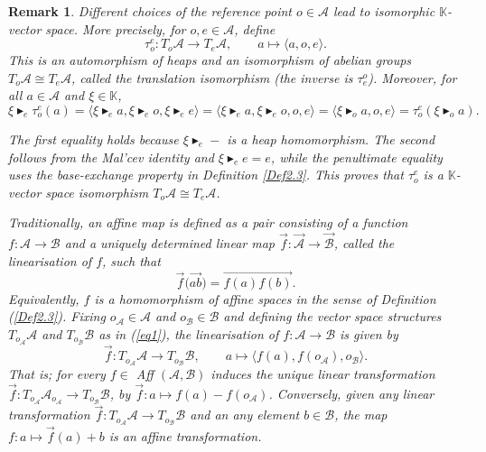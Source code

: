 \documentclass[14pt]{article}
\theoremstyle{Definition}
\newtheorem{Rem}[thm]{Remark}
\theoremstyle{remark}
\begin{document}
\medskip
\noindent
\begin{Rem}\cite{Brz1}\label{Rem1}
Different choices of the reference point $o \in \mathcal{A}$ lead to 
isomorphic $\mathbb{K}$- vector space. More precisely, for $o,e \in \mathcal{A}$, define
\[
\tau^{e}_{o} \colon T_{o}\mathcal{A} \longrightarrow T_{e}\mathcal{A}, \qquad 
a \longmapsto \langle a, o, e \rangle.
\]
This is an automorphism of heaps and an isomorphism of abelian groups 
$T_{o}\mathcal{A} \cong T_{e}\mathcal{A}$, called the \textit{translation isomorphism} 
(the inverse is $\tau^{o}_{e}$). Moreover, for all $a \in \mathcal{A}$ and $\xi \in \mathbb{K}$,
\[
\xi \blacktriangleright_{e} \tau^{e}_{o}(a) 
= \langle \xi \blacktriangleright_{e} a, \xi \blacktriangleright_{e} o, \xi \blacktriangleright_{e} e \rangle
= \langle \xi \blacktriangleright_{e} a, \xi \blacktriangleright_{e} o, o, e \rangle
= \langle \xi \blacktriangleright_{o} a, o, e \rangle 
= \tau^{e}_{o} (\xi \blacktriangleright_{o} a).
\]

The first equality holds because $\xi \blacktriangleright_{e}-$ is a heap homomorphism. The second follows from the Mal'cev identity and $\xi\blacktriangleright_{e}e=e$, while the penultimate equality 
uses the base-exchange property in Definition \ref{Def2.3}. This proves that 
$\tau^{e}_{o}$ is a $\mathbb{K}$- vector space isomorphism $T_{o}\mathcal{A} \cong T_{e}\mathcal{A}$.

Traditionally, an affine map is defined as a pair consisting of a function 
$f \colon \mathcal{A} \to \mathcal{B}$ and a uniquely determined linear map 
$\overrightarrow{f} \colon \overrightarrow{\mathcal{A}} \to \overrightarrow{\mathcal{B}}$, called the \textit{linearisation} of $f$, such that
\[
\overrightarrow{f}\bigl(\overrightarrow{ab}\bigr) = \overrightarrow{f(a)f(b)}.
\]
Equivalently, $f$ is a homomorphism of affine spaces in the sense of Definition (\ref{Def2.3}). 
Fixing $o_{\mathcal{A}} \in \mathcal{A}$ and $o_{\mathcal{B}} \in \mathcal{B}$ and defining the vector space structures 
$T_{{o}_{\mathcal{A}}}\mathcal{A}$ and $T_{{o}_{\mathcal{B}}}\mathcal{B}$ as in (\ref{eq1}), the linearisation of $f \colon \mathcal{A} \to \mathcal{B}$ is given by
\begin{equation}\label{eq1a}
\overrightarrow{f}\colon T_{o_{\mathcal{A}}}\mathcal{A} \longrightarrow T_{o_{\mathcal{B}}}\mathcal{B}, \qquad 
a \longmapsto \langle f(a), f(o_{\mathcal{A}}), o_{\mathcal{B}} \rangle.
\end{equation}
That is; for every $f\in $ Aff $(\mathcal{A},\mathcal{B})$ induces the unique linear transformation $\overrightarrow{f}\colon T_{o_{\mathcal{A}}}\mathcal{A}_{o_{\mathcal{A}}} \longrightarrow T_{o_{\mathcal{B}}}\mathcal{B}$, by $\overrightarrow{f}:a\mapsto f(a)-f(o_{\mathcal{A}})$. Conversely, given any linear transformation $\overrightarrow{f}\colon T_{o_{\mathcal{A}}}\mathcal{A} \longrightarrow T_{o_{\mathcal{B}}}\mathcal{B}$ and an any element $b\in \mathcal{B}$, the map $f:a\mapsto \overrightarrow{f}(a)+b$ is an affine transformation.
\end{Rem}
\end{document}
